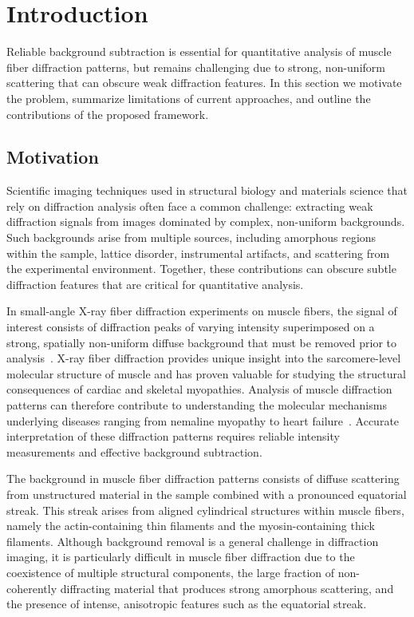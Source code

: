 \documentclass[iucr]{iucrjournals}
\begin{document}




\section{Introduction}

Reliable background subtraction is essential for quantitative analysis of muscle fiber diffraction patterns, but remains challenging due to strong, non-uniform scattering that can obscure weak diffraction features. In this section we motivate the problem, summarize limitations of current approaches, and outline the contributions of the proposed framework.

\subsection{Motivation}

Scientific imaging techniques used in structural biology and materials science that rely on diffraction analysis often face a common challenge: extracting weak diffraction signals from images dominated by complex, non-uniform backgrounds. Such backgrounds arise from multiple sources, including amorphous regions within the sample, lattice disorder, instrumental artifacts, and scattering from the experimental environment. Together, these contributions can obscure subtle diffraction features that are critical for quantitative analysis.

In small-angle X-ray fiber diffraction experiments on muscle fibers, the signal of interest consists of diffraction peaks of varying intensity superimposed on a strong, spatially non-uniform diffuse background that must be removed prior to analysis~\cite{ResearchPlanMusico}. X-ray fiber diffraction provides unique insight into the sarcomere-level molecular structure of muscle and has proven valuable for studying the structural consequences of cardiac and skeletal myopathies. Analysis of muscle diffraction patterns can therefore contribute to understanding the molecular mechanisms underlying diseases ranging from nemaline myopathy to heart failure~\cite{MaIrving2022}. Accurate interpretation of these diffraction patterns requires reliable intensity measurements and effective background subtraction.

The background in muscle fiber diffraction patterns consists of diffuse scattering from unstructured material in the sample combined with a pronounced equatorial streak. This streak arises from aligned cylindrical structures within muscle fibers, namely the actin-containing thin filaments and the myosin-containing thick filaments. Although background removal is a general challenge in diffraction imaging, it is particularly difficult in muscle fiber diffraction due to the coexistence of multiple structural components, the large fraction of non-coherently diffracting material that produces strong amorphous scattering, and the presence of intense, anisotropic features such as the equatorial streak.
\end{document}
